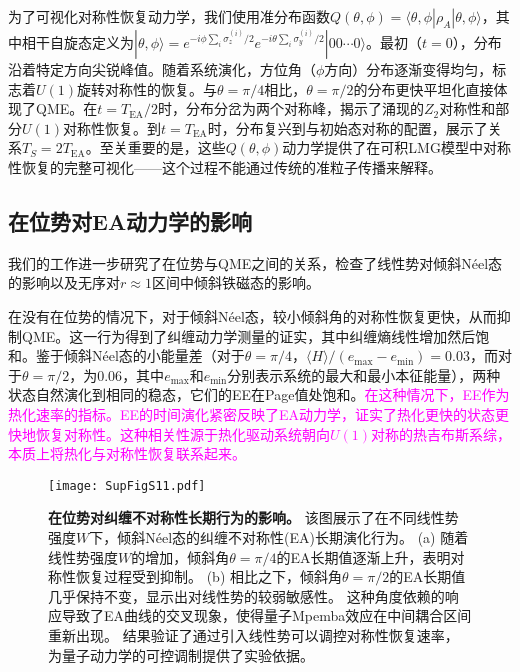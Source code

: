 \documentclass[11pt,a4paper]{article}
\begin{document}
为了可视化对称性恢复动力学，我们使用准分布函数$Q(\theta,\phi)=\langle\theta,\phi|\rho_A|\theta,\phi\rangle$，其中相干自旋态定义为$|\theta,\phi\rangle=e^{-i\phi\sum_i\sigma_z^{(i)}/2}e^{-i\theta\sum_i\sigma_y^{(i)}/2}|00\cdots 0\rangle$。最初（$t=0$），分布沿着特定方向尖锐峰值。随着系统演化，方位角（$\phi$方向）分布逐渐变得均匀，标志着$U(1)$旋转对称性的恢复。与$\theta=\pi/4$相比，$\theta=\pi/2$的分布更快平坦化直接体现了QME。在$t=T_{\text{EA}}/2$时，分布分岔为两个对称峰，揭示了涌现的$Z_2$对称性和部分$U(1)$对称性恢复。到$t=T_{\text{EA}}$时，分布复兴到与初始态对称的配置，展示了关系$T_S=2T_{\text{EA}}$。至关重要的是，这些$Q(\theta,\phi)$动力学提供了在可积LMG模型中对称性恢复的完整可视化——这个过程不能通过传统的准粒子传播来解释。

\subsection{在位势对EA动力学的影响}

我们的工作进一步研究了在位势与QME之间的关系，检查了线性势对倾斜Néel态的影响以及无序对$r\approx 1$区间中倾斜铁磁态的影响。

在没有在位势的情况下，对于倾斜Néel态，较小倾斜角的对称性恢复更快，从而抑制QME。这一行为得到了纠缠动力学测量的证实，其中纠缠熵线性增加然后饱和。鉴于倾斜Néel态的小能量差（对于$\theta=\pi/4$，$\langle H\rangle/(e_{\text{max}}-e_{\text{min}})=0.03$，而对于$\theta=\pi/2$，为$0.06$，其中$e_{\text{max}}$和$e_{\text{min}}$分别表示系统的最大和最小本征能量），两种状态自然演化到相同的稳态，它们的EE在Page值处饱和。\textcolor{magenta}{在这种情况下，EE作为热化速率的指标。EE的时间演化紧密反映了EA动力学，证实了热化更快的状态更快地恢复对称性。这种相关性源于热化驱动系统朝向$U(1)$对称的热吉布斯系综，本质上将热化与对称性恢复联系起来。}

\begin{figure}[H]
    \centering
    \texttt{[image: SupFigS11.pdf]}
    \caption{
        \textbf{在位势对纠缠不对称性长期行为的影响。}
        该图展示了在不同线性势强度$W$下，倾斜Néel态的纠缠不对称性(EA)长期演化行为。
        (a) 随着线性势强度$W$的增加，倾斜角$\theta=\pi/4$的EA长期值逐渐上升，表明对称性恢复过程受到抑制。
        (b) 相比之下，倾斜角$\theta=\pi/2$的EA长期值几乎保持不变，显示出对线性势的较弱敏感性。
        这种角度依赖的响应导致了EA曲线的交叉现象，使得量子Mpemba效应在中间耦合区间重新出现。
        结果验证了通过引入线性势可以调控对称性恢复速率，为量子动力学的可控调制提供了实验依据。
    }
    \label{fig:onsite_potential_EA_effects}
\end{figure}
\end{document}
